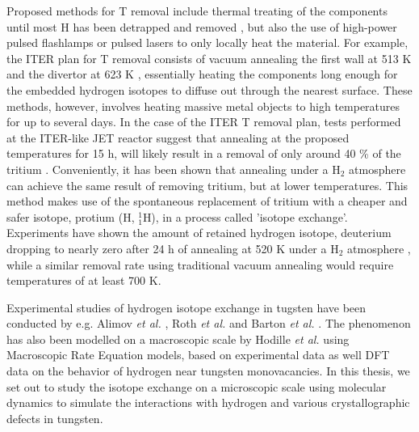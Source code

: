 Proposed methods for T removal include thermal treating of the components until most H has been detrapped and removed \cite{heinola2017long}, but also the use of high-power pulsed flashlamps \cite{gibson2005removal} or pulsed lasers \cite{skinner2008recent,de2017efficiency} to only locally heat the material. For example, the ITER plan for T removal consists of vacuum annealing the first wall at 513 K and the divertor at 623 K \cite{pitts2011physics}, essentially heating the components long enough for the embedded hydrogen isotopes to diffuse out through the nearest surface.
These methods, however, involves heating massive metal objects to high temperatures for up to several days. In the case of the ITER T removal plan, tests performed at the ITER-like JET reactor suggest that annealing at the proposed temperatures for 15 h, will likely result in a removal of only around 40 \% of the tritium \cite{heinola2017long}. Conveniently, it has been shown that annealing under a H$_2$ atmosphere can achieve the same result of removing tritium, but at lower temperatures. This method makes use of the spontaneous replacement of tritium with a cheaper and safer isotope, protium (H, $^1_1$H), in a process called 'isotope exchange'. Experiments have shown the amount of retained hydrogen isotope, deuterium dropping to nearly zero after 24 h of annealing at 520 K under a H$_2$ atmosphere \cite{ahlgren2019hydrogen}, while a similar removal rate using traditional vacuum annealing would require temperatures of at least 700 K.

Experimental studies of hydrogen isotope exchange in tugsten have been conducted by e.g. Alimov \textit{et al.} \cite{alimov2011hydrogen}, Roth \textit{et al.}  \cite{roth2013hydrogen} and Barton \textit{et al.} \cite{barton2014deuterium}. The phenomenon has also been modelled on a macroscopic scale by Hodille \textit{et al.} \cite{hodille2016study} using Macroscopic Rate Equation models, based on experimental data as well DFT data on the behavior of hydrogen near tungsten monovacancies. In this thesis, we set out to study the isotope exchange on a microscopic scale using molecular dynamics to simulate the interactions with hydrogen and various crystallographic defects in tungsten.
